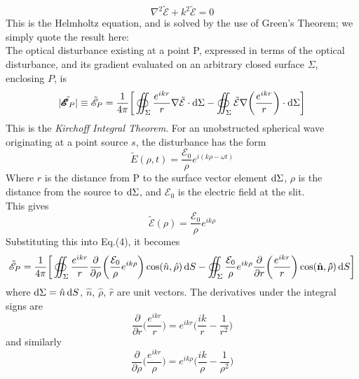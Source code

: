 \documentclass[a4paper,11pt]{article}
\begin{document}
\begin{equation}
\nabla^2 \tilde{\pmb{\mathscr{E}}} + k^2 \tilde{\pmb{\mathscr{E}}} = 0
\end{equation}
This is the Helmholtz equation, and is solved by the use of Green's Theorem; we simply quote the result here: \\
The optical disturbance existing at a point P, expressed in terms of the optical disturbance, and its gradient evaluated on an arbitrary closed surface $\Sigma$, enclosing $P$, is
\begin{equation} 
|\tilde{\pmb{\mathscr{E}}_P}| \equiv \tilde{\mathscr{E}}_P = \frac{1}{4\pi} \bigg[\oiint_{\Sigma} \frac{e^{ikr}}{r}\nabla\tilde{\mathcal{E}} \cdot \dif \Sigma - \oiint_{\Sigma} \tilde{\mathcal{E}}\nabla\bigg(\frac{e^{ikr}}{r}\bigg)\cdot \dif \Sigma\bigg]
\end{equation}
This is the \textit{Kirchoff Integral Theorem}. For an unobstructed spherical wave originating at a point source $s$, the disturbance has the form
\begin{equation} 
\tilde{E}(\rho,t) = \frac{\mathcal{E}_0}{\rho} e^{i(k\rho - \omega t)}
\end{equation}
Where $r$ is the distance from P to the surface vector element $\dif \Sigma$, $\rho$ is the distance from the source to $\dif \Sigma$, and $\mathcal{E}_0$ is the electric field at the slit.\\
\newline
This gives
\begin{equation}
\tilde{\mathcal{E}}(\rho) = \frac{\mathcal{E}_0}{\rho}e^{ik\rho}
\end{equation}
Substituting this into Eq.(4), it becomes 
\begin{equation}
\tilde{\mathscr{E}}_P = \frac{1}{4\pi} \bigg[ \displaystyle\oiint_{\Sigma} \frac{e^{ikr}}{r}\frac{\partial}{\partial \rho}\bigg(\frac{\mathcal{E}_0}{\rho}e^{ik\rho}\bigg) \cos(\hat{n},\hat{\rho})\dif S - \displaystyle\oiint_{\Sigma} \frac{\mathcal{E}_0}{\rho}e^{ik\rho}\frac{\partial}{\partial r}\bigg(\frac{e^{ikr}}{r}\bigg) \cos(\hat{\mathbf{n}},\mathbf{\hat{\rho}})\dif S\bigg]
\end{equation}
where $\dif \Sigma = \hat{n} \dif S$, $\hat{n}$, $\hat{\rho}$, $\hat{r}$ are unit vectors. The derivatives under the integral signs are
\begin{equation}
\frac{\partial}{\partial r}\bigg(\frac{e^{ikr}}{r}\bigg) = e^{ikr} \bigg(\frac{ik}{r} - \frac{1}{r^2}\bigg)
\end{equation}
and similarly 
\begin{equation}
\frac{\partial}{\partial \rho}\bigg(\frac{e^{ikr}}{\rho}\bigg) = e^{ik\rho} \bigg(\frac{ik}{\rho} - \frac{1}{\rho^2}\bigg)
\end{equation}
\end{document}
